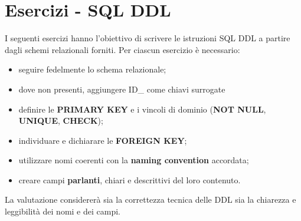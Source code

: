 \documentclass[a4paper,12pt]{article}
\begin{document}
\newpage
\section{Esercizi - SQL DDL}

I seguenti esercizi hanno l'obiettivo di scrivere le istruzioni SQL DDL a partire dagli schemi relazionali forniti. Per ciascun esercizio è necessario:
\begin{itemize}
    \item seguire fedelmente lo schema relazionale;
    \item dove non presenti, aggiungere ID\_ come chiavi surrogate
    \item definire le \textbf{PRIMARY KEY} e i vincoli di dominio (\textbf{NOT NULL}, \textbf{UNIQUE}, \textbf{CHECK});
    \item individuare e dichiarare le \textbf{FOREIGN KEY};
    \item utilizzare nomi coerenti con la \textbf{naming convention} accordata;
    \item creare campi \textbf{parlanti}, chiari e descrittivi del loro contenuto.
\end{itemize}
La valutazione considererà sia la correttezza tecnica delle DDL sia la chiarezza e leggibilità dei nomi e dei campi.
\end{document}
